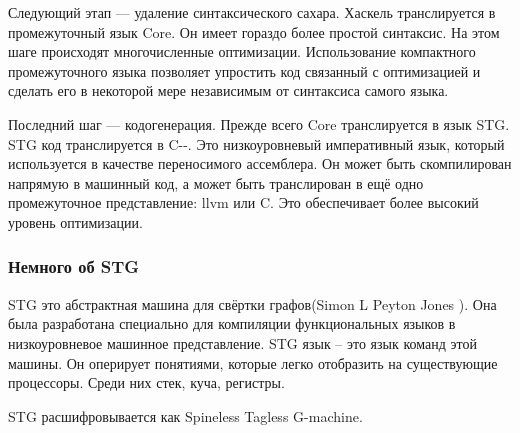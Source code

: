 \documentclass[fontsize=14pt, paper=a4, pagesize, DIV=calc]{scrartcl}
\begin{document}
Следующий этап --- удаление синтаксического сахара. Хаскель транслируется в
промежуточный язык Core. Он имеет гораздо более простой синтаксис. На этом шаге
происходят многочисленные оптимизации. Использование компактного промежуточного
языка позволяет упростить код связанный с оптимизацией и сделать его в
некоторой мере независимым от синтаксиса самого языка.

Последний шаг --- кодогенерация. Прежде всего Core транслируется в язык STG.
STG код транслируется в C-{}-. Это низкоуровневый императивный язык, который
используется в качестве переносимого ассемблера. Он может быть скомпилирован
напрямую в машинный код, а может быть транслирован в ещё одно промежуточное
представление: llvm или C. Это обеспечивает более высокий уровень оптимизации.

\subsubsection{Немного об STG}

STG это абстрактная машина для свёртки графов(Simon L Peyton Jones
\cite{funcOnStockHard}). Она была разработана специально для компиляции
функциональных языков в низкоуровневое машинное представление.  STG язык -- это
язык команд этой машины. Он оперирует понятиями, которые легко отобразить на
существующие процессоры. Среди них стек, куча, регистры. 

STG расшифровывается как Spineless Tagless G-machine.
\end{document}

